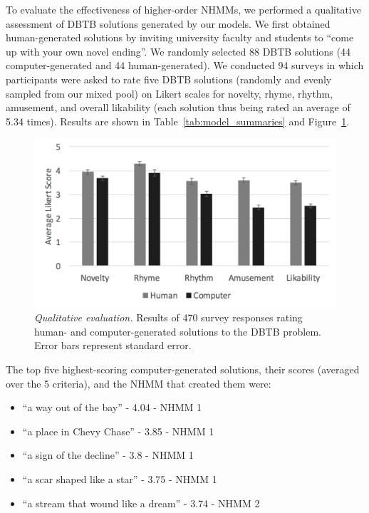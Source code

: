 \documentclass[phd,electronic,oneside,twosidetoc,letterpaper,chaptercenter,parttop,lof,lot]{byumsphd}
\begin{document}
To evaluate the effectiveness of higher-order NHMMs, we performed a qualitative assessment of DBTB solutions generated by our models. We first obtained human-generated solutions by inviting university faculty and students to ``come up with your own novel ending''. We randomly selected 88 DBTB solutions (44 computer-generated and 44 human-generated). We conducted 94 surveys in which participants were asked to rate five DBTB solutions (randomly and evenly sampled from our mixed pool) on Likert scales for novelty, rhyme, rhythm, amusement, and overall likability (each solution thus being rated an average of 5.34 times). Results are shown in Table~\ref{tab:model_summaries} and Figure~\ref{fig:results}.

\begin{figure} 
\centering
\includegraphics[width=\linewidth]{evaluative_results}
\caption{\textit{Qualitative evaluation.} Results of 470 survey responses rating human- and computer-generated solutions to the DBTB problem. Error bars represent standard error.}
\label{fig:results}
\end{figure}

The top five highest-scoring computer-generated solutions, their scores (averaged over the 5 criteria), and the NHMM that created them were:
\begin{itemize}
\item ``a way out of the bay'' - 4.04 - NHMM 1
\item ``a place in Chevy Chase'' - 3.85 - NHMM 1
\item ``a sign of the decline'' - 3.8 - NHMM 1
\item ``a scar shaped like a star'' - 3.75 - NHMM 1
\item ``a stream that wound like a dream'' - 3.74 - NHMM 2
\end{itemize}
\end{document}
